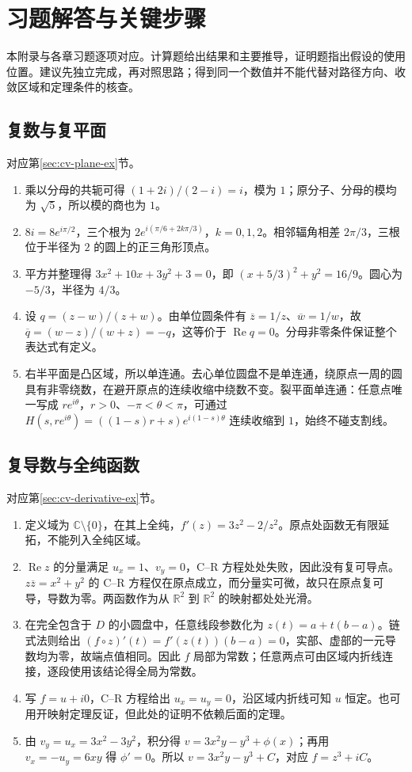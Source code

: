 \documentclass[UTF8,12pt,a4paper,fontset=fandol]{ctexbook}
\begin{document}
\appendix
\chapter{习题解答与关键步骤}
\label{chap:cv-solutions}

本附录与各章习题逐项对应。计算题给出结果和主要推导，证明题指出假设的使用位置。建议先独立完成，再对照思路；得到同一个数值并不能代替对路径方向、收敛区域和定理条件的核查。

\section{复数与复平面}
对应第\ref{sec:cv-plane-ex}节。
\begin{enumerate}
 \item 乘以分母的共轭可得 $(1+2i)/(2-i)=i$，模为 $1$；原分子、分母的模均为 $\sqrt5$，所以模的商也为 $1$。
 \item $8i=8e^{i\pi/2}$，三个根为 $2e^{i(\pi/6+2k\pi/3)}$，$k=0,1,2$。相邻辐角相差 $2\pi/3$，三根位于半径为 $2$ 的圆上的正三角形顶点。
 \item 平方并整理得 $3x^2+10x+3y^2+3=0$，即 $(x+5/3)^2+y^2=16/9$。圆心为 $-5/3$，半径为 $4/3$。
 \item 设 $q=(z-w)/(z+w)$。由单位圆条件有 $\overline z=1/z$、$\overline w=1/w$，故 $\overline q=(w-z)/(w+z)=-q$，这等价于 $\operatorname{Re}q=0$。分母非零条件保证整个表达式有定义。
 \item 右半平面是凸区域，所以单连通。去心单位圆盘不是单连通，绕原点一周的圆具有非零绕数，在避开原点的连续收缩中绕数不变。裂平面单连通：任意点唯一写成 $re^{i\theta}$，$r>0$、$-\pi<\theta<\pi$，可通过 $H(s,re^{i\theta})=((1-s)r+s)e^{i(1-s)\theta}$ 连续收缩到 $1$，始终不碰支割线。
\end{enumerate}

\section{复导数与全纯函数}
对应第\ref{sec:cv-derivative-ex}节。
\begin{enumerate}
 \item 定义域为 $\mathbb C\setminus\{0\}$，在其上全纯，$f'(z)=3z^2-2/z^2$。原点处函数无有限延拓，不能列入全纯区域。
 \item $\operatorname{Re}z$ 的分量满足 $u_x=1$、$v_y=0$，C--R 方程处处失败，因此没有复可导点。$z\overline z=x^2+y^2$ 的 C--R 方程仅在原点成立，而分量实可微，故只在原点复可导，导数为零。两函数作为从 $\mathbb R^2$ 到 $\mathbb R^2$ 的映射都处处光滑。
 \item 在完全包含于 $D$ 的小圆盘中，任意线段参数化为 $z(t)=a+t(b-a)$。链式法则给出 $(f\circ z)'(t)=f'(z(t))(b-a)=0$，实部、虚部的一元导数均为零，故端点值相同。因此 $f$ 局部为常数；任意两点可由区域内折线连接，逐段使用该结论得全局为常数。
 \item 写 $f=u+i0$，C--R 方程给出 $u_x=u_y=0$，沿区域内折线可知 $u$ 恒定。也可用开映射定理反证，但此处的证明不依赖后面的定理。
 \item 由 $v_y=u_x=3x^2-3y^2$，积分得 $v=3x^2y-y^3+\phi(x)$；再用 $v_x=-u_y=6xy$ 得 $\phi'=0$。所以 $v=3x^2y-y^3+C$，对应 $f=z^3+iC$。
\end{enumerate}
\end{document}
